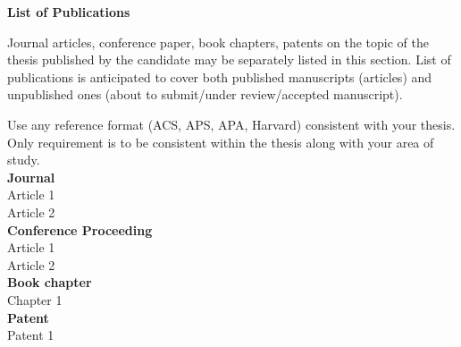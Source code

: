 




\begin{center}
{\LARGE \textbf{List of Publications}}
\end{center}


Journal articles, conference paper, book chapters, patents on the topic of the thesis published by the candidate may be separately listed in this section. List of publications is anticipated to cover both published manuscripts (articles) and unpublished ones (about to submit/under review/accepted manuscript).

Use any reference format (ACS, APS, APA, Harvard) consistent with your thesis. Only requirement is to be consistent within the thesis along with your area of study.\\

\textbf{Journal}\\
Article 1\\
Article 2\\

\textbf{Conference Proceeding}\\
Article 1\\
Article 2\\

\textbf{Book chapter}\\
Chapter 1\\

\textbf{Patent}\\
Patent 1


\begin{center}
\textit{}
\end{center}

\newpage